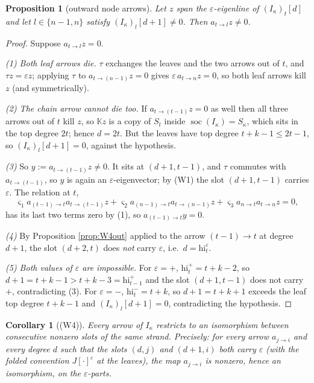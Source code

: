 \documentclass[reqno]{amsart}
\theoremstyle{plain}
\newtheorem{proposition}[theorem]{Proposition}
\newtheorem{corollary}[theorem]{Corollary}
\theoremstyle{definition}
\DeclareMathOperator{\soc}{soc}
\newcommand{\ka}{\kappa}
\newcommand{\eps}{\varepsilon}
\newcommand{\hi}{\mathrm{hi}}
\begin{document}
\begin{proposition}[outward node arrows]\label{prop:W4n}
Let $z$ span the $\eps$-eigenline of $(I_\ka)_t[d]$ and let $l\in\{n-1,n\}$
satisfy $(I_\ka)_l[d+1]\ne0$.  Then $a_{t\to l}z\ne0$.
\end{proposition}

\begin{proof}
Suppose $a_{t\to l}z=0$.

\emph{(1) Both leaf arrows die.}  $\tau$ exchanges the leaves and the two
arrows out of $t$, and $\tau z=\eps z$; applying $\tau$ to
$a_{t\to(n-1)}z=0$ gives $\eps\,a_{t\to n}z=0$, so both leaf arrows kill $z$
(and symmetrically).

\emph{(2) The chain arrow cannot die too.}  If $a_{t\to(t-1)}z=0$ as well then
all three arrows out of $t$ kill $z$, so $\mathbb{K}z$ is a copy of $S_t$ inside
$\soc(I_\ka)=S_\ka$, which sits in the top degree $2t$; hence $d=2t$.  But the
leaves have top degree $t+k-1\le 2t-1$, so $(I_\ka)_l[d+1]=0$, against the
hypothesis.

\emph{(3)} So $y:=a_{t\to(t-1)}z\ne0$.  It sits at $(d+1,t-1)$, and $\tau$
commutes with $a_{t\to(t-1)}$, so $y$ is again an $\eps$-eigenvector; by (W1)
the slot $(d+1,t-1)$ carries $\eps$.  The relation at $t$,
\[
   \varsigma_1a_{(t-1)\to t}a_{t\to(t-1)}z+\varsigma_2a_{(n-1)\to t}a_{t\to(n-1)}z
   +\varsigma_3a_{n\to t}a_{t\to n}z=0,
\]
has its last two terms zero by (1), so $a_{(t-1)\to t}y=0$.

\emph{(4)} By Proposition \ref{prop:W4out} applied to the arrow
$(t-1)\to t$ at degree $d+1$, the slot $(d+2,t)$ does \emph{not} carry $\eps$,
i.e.\ $d=\hi^{\eps}_t$.

\emph{(5) Both values of $\eps$ are impossible.}  For $\eps=+$, $\hi^+_t=t+k-2$,
so $d+1=t+k-1>t+k-3=\hi^+_{t-1}$ and the slot $(d+1,t-1)$ does not carry $+$,
contradicting (3).  For $\eps=-$, $\hi^-_t=t+k$, so $d+1=t+k+1$ exceeds the
leaf top degree $t+k-1$ and $(I_\ka)_l[d+1]=0$, contradicting the hypothesis.
\end{proof}

\begin{corollary}[\textup{(W4)}]\label{cor:W4}
Every arrow of $I_\ka$ restricts to an isomorphism between consecutive nonzero
slots of the same strand.  Precisely: for every arrow $a_{j\to i}$ and every
degree $d$ such that the slots $(d,j)$ and $(d+1,i)$ both carry $\eps$
\textup{(}with the folded convention $J[\cdot]^{\eps}$ at the leaves\textup{)},
the map $a_{j\to i}$ is nonzero, hence an isomorphism, on the $\eps$-parts.
\end{corollary}
\end{document}
